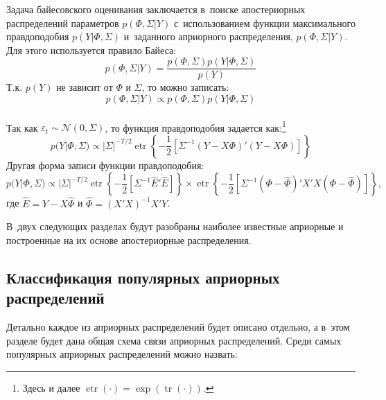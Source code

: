 \documentclass[11pt]{article} %
\DeclareMathOperator{\etr}{etr}
\DeclareMathOperator{\tr}{tr}
\newcommand{\cN}{\mathcal{N}}
\begin{document}
Задача байесовского оценивания заключается в~поиске апостериорных распределений параметров $p(\Phi, \Sigma|Y)$ с~использованием функции максимального правдоподобия $p(Y|\Phi, \Sigma)$ и~заданного априорного распределения, $p(\Phi, \Sigma|Y)$. Для этого используется правило Байеса:
\begin{equation}
p(\Phi, \Sigma|Y)=\frac{p(\Phi,\Sigma) p(Y|\Phi,\Sigma)}{p(Y)}
\end{equation}
Т.к. $p(Y)$ не зависит от $\Phi$ и $\Sigma$, то можно записать:
\begin{equation}
p(\Phi, \Sigma|Y)\propto p(\Phi,\Sigma) p(Y|\Phi,\Sigma)
\end{equation}\\
Так как $\varepsilon_t\sim \cN(0,\Sigma)$, то функция правдоподобия задается как:\footnote{Здесь и далее $\etr(\cdot)=\exp(\tr(\cdot))$.}
\begin{equation}
p(Y|\Phi, \Sigma) \propto |\Sigma|^{-T/2}\etr\left\lbrace -\frac{1}{2}  \left[\Sigma^{-1}(Y-X\Phi)'(Y-X\Phi)\right]\right\rbrace\label{likelihood}
\end{equation}
Другая форма записи функции правдоподобия:
\begin{equation}
p(Y|\Phi, \Sigma) \propto |\Sigma|^{-T/2}\etr\left\lbrace -\frac{1}{2}  \left[\Sigma^{-1} \hat E' \hat E\right]\right\rbrace \times \etr\left\lbrace -\frac{1}{2}  \left[\Sigma^{-1}(\Phi-\hat\Phi)'X'X(\Phi-\hat\Phi)\right]\right\rbrace,
\end{equation}
где $\hat E=Y-X\hat\Phi$ и $\hat \Phi=(X'X)^{-1}X'Y$.

В~двух следующих разделах будут разобраны наиболее известные априорные и построенные на их основе апостериорные распределения.


\subsection{Классификация популярных априорных распределений}

Детально каждое из априорных распределений будет описано отдельно, а в~этом разделе будет дана общая схема связи априорных распределений.
Среди самых популярных априорных распределений можно назвать:
\end{document}
